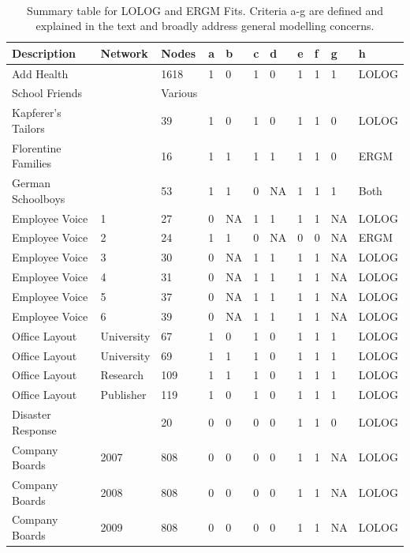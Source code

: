 \documentclass[
]{statsoc}
\begin{document}
\begin{table}
\caption{\label{tab:summary_table} Summary table for LOLOG and ERGM Fits. Criteria a-g are defined and explained in the text and broadly address general modelling concerns.}\\
\begin{tabular}[t]{lllllllllll}
\toprule
Description & Network & Nodes & a & b & c & d & e & f & g & h\\
\midrule
\rowcolor{gray!6}  Add Health &  & 1618 & 1 & 0 & 1 & 0 & 1 & 1 & 1 & LOLOG\\
School Friends &  & Various &  &  &  &  &  &  &  & \\
\rowcolor{gray!6}  Kapferer's Tailors &  & 39 & 1 & 0 & 1 & 0 & 1 & 1 & 0 & LOLOG\\
Florentine Families &  & 16 & 1 & 1 & 1 & 1 & 1 & 1 & 0 & ERGM\\
\rowcolor{gray!6}  German Schoolboys &  & 53 & 1 & 1 & 0 & NA & 1 & 1 & 1 & Both\\
\addlinespace
Employee Voice & 1 & 27 & 0 & NA & 1 & 1 & 1 & 1 & NA & LOLOG\\
\rowcolor{gray!6}  Employee Voice & 2 & 24 & 1 & 1 & 0 & NA & 0 & 0 & NA & ERGM\\
Employee Voice & 3 & 30 & 0 & NA & 1 & 1 & 1 & 1 & NA & LOLOG\\
\rowcolor{gray!6}  Employee Voice & 4 & 31 & 0 & NA & 1 & 1 & 1 & 1 & NA & LOLOG\\
Employee Voice & 5 & 37 & 0 & NA & 1 & 1 & 1 & 1 & NA & LOLOG\\
\addlinespace
\rowcolor{gray!6}  Employee Voice & 6 & 39 & 0 & NA & 1 & 1 & 1 & 1 & NA & LOLOG\\
Office Layout & University & 67 & 1 & 0 & 1 & 0 & 1 & 1 & 1 & LOLOG\\
\rowcolor{gray!6}  Office Layout & University & 69 & 1 & 1 & 1 & 0 & 1 & 1 & 1 & LOLOG\\
Office Layout & Research & 109 & 1 & 1 & 1 & 0 & 1 & 1 & 1 & LOLOG\\
\rowcolor{gray!6}  Office Layout & Publisher & 119 & 1 & 0 & 1 & 0 & 1 & 1 & 1 & LOLOG\\
\addlinespace
Disaster Response &  & 20 & 0 & 0 & 0 & 0 & 1 & 1 & 0 & LOLOG\\
\rowcolor{gray!6}  Company Boards & 2007 & 808 & 0 & 0 & 0 & 0 & 1 & 1 & NA & LOLOG\\
Company Boards & 2008 & 808 & 0 & 0 & 0 & 0 & 1 & 1 & NA & LOLOG\\
\rowcolor{gray!6}  Company Boards & 2009 & 808 & 0 & 0 & 0 & 0 & 1 & 1 & NA & LOLOG\\

\end{tabular}
\end{table}
\end{document}
